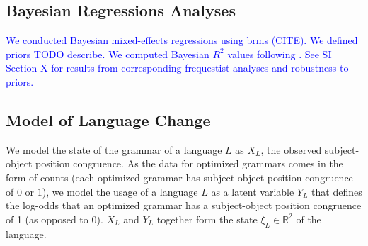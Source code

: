\documentclass[9pt,twocolumn,twoside,lineno]{pnas-new}
\begin{document}
{\subsection*{Bayesian Regressions Analyses}
\textcolor{blue}{
We conducted Bayesian mixed-effects regressions using brms (CITE).
We defined priors TODO describe.
We computed Bayesian $R^2$ values following \cite{gelman2019r}.
See SI Section X for results from corresponding frequestist analyses and robustness to priors.}



\subsection*{Model of Language Change}



We model the state of the grammar of a language $L$ as $X_L$, the observed subject-object position congruence.
As the data for optimized grammars comes in the form of counts (each optimized grammar has subject-object position congruence of $0$ or $1$), we model the usage of a language $L$ as a latent variable $Y_L$ that defines the log-odds that an optimized grammar has a subject-object position congruence of 1 (as opposed to 0).
$X_L$ and $Y_L$ together form the state $\xi_L \in \mathbb{R}^2$  of the language.



}
\end{document}
